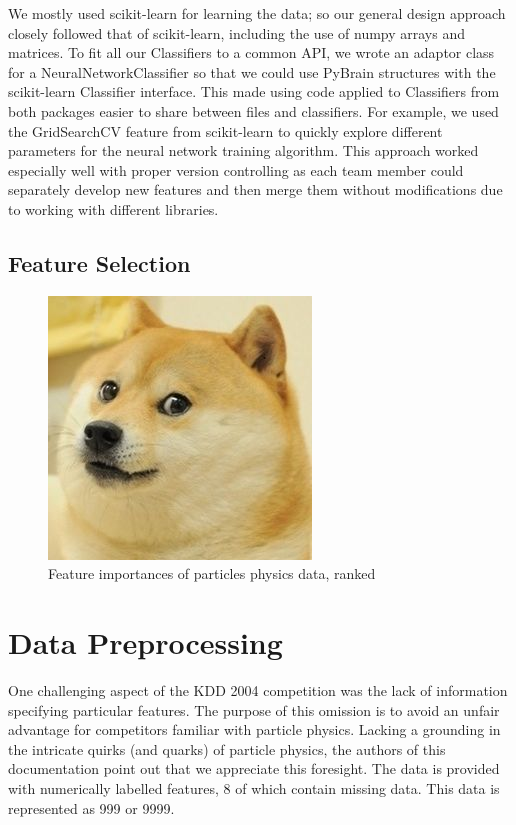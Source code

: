\documentclass{article}
\begin{document}
We mostly used scikit-learn for learning the data; so our general design approach closely followed that of scikit-learn, including the use of numpy arrays and matrices.
To fit all our Classifiers to a common API, we wrote an adaptor class for a NeuralNetworkClassifier so that we could use PyBrain structures with the scikit-learn Classifier interface.
This made using code applied to Classifiers from both packages easier to share between files and classifiers.
For example, we used the GridSearchCV feature from scikit-learn to quickly explore different parameters for the neural network training algorithm.
This approach worked especially well with proper version controlling as each team member could separately develop new features and then merge them without modifications due to working with different libraries.

\subsection{Feature Selection}
\label{feature_selection}

\begin{figure}[!h]
\centering
\includegraphics{placeholder}
\caption{Feature importances of particles physics data, ranked}
\label{fig:placeholder2}
\end{figure}




\section{Data Preprocessing}

One challenging aspect of the KDD 2004 competition was the lack of information specifying particular features.
The purpose of this omission is to avoid an unfair advantage for competitors familiar with particle physics.
Lacking a grounding in the intricate quirks (and quarks) of particle physics, the authors of this documentation point out that we appreciate this foresight.
The data is provided with numerically labelled features, 8 of which contain missing data.
This data is represented as 999 or 9999.
\end{document}
